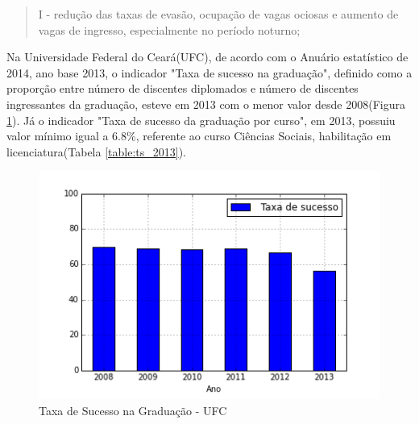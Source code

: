\begin{quote}
I - redução das taxas de evasão, ocupação de vagas ociosas e aumento de vagas de ingresso, especialmente no período noturno;
\end{quote}


Na Universidade Federal do Ceará(UFC), de acordo com o Anuário estatístico de 2014, ano base 2013, o indicador "Taxa de sucesso na graduação", definido como a proporção entre número de discentes diplomados e número de discentes ingressantes da graduação, esteve em 2013 com o menor valor desde 2008(Figura \ref{img:taxa-de-sucesso-ufc}). Já o indicador "Taxa de sucesso da graduação por curso", em 2013, possuiu valor mínimo igual a 6.8\%, referente ao curso Ciências Sociais, habilitação em licenciatura(Tabela \ref{table:ts_2013}).

\begin{figure}[H]
	\includegraphics[scale=0.8]{img/taxa-de-sucesso-ufc.png}
	\caption{Taxa de Sucesso na Graduação - UFC}
	\label{img:taxa-de-sucesso-ufc}
\end{figure}

